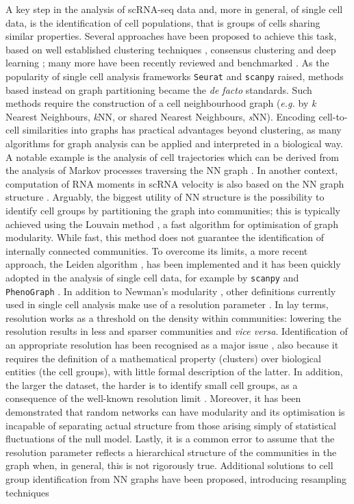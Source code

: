 \documentclass[10pt]{article}
\begin{document}
A key step in the analysis of scRNA-seq data and, more in general, of single cell data, is the identification of cell populations, that is groups of cells sharing similar properties. Several approaches have been proposed to achieve this task, based on well established clustering techniques \cite{wang_2017, lin_2017}, consensus clustering \cite{huh_2020, kiselev_2017, Ranjan_2021} and deep learning \cite{li_2020}; many more have been recently reviewed \cite{krzak_2019, kiselev_2019} and benchmarked \cite{du_2018}. As the popularity of single cell analysis frameworks \texttt{Seurat} \cite{butler_2018} and \texttt{scanpy} \cite{wolf_2018} raised, methods based instead on graph partitioning became the \emph{de facto} standards. Such methods require the construction of a cell neighbourhood graph (\emph{e.g.} by \emph{k }Nearest Neighbours, \emph{k}NN, or shared Nearest Neighbours, \emph{s}NN). Encoding cell-to-cell similarities into graphs has practical advantages beyond clustering, as many algorithms for graph analysis can be applied and interpreted in a biological way. A notable example is the analysis of cell trajectories which can be derived from the analysis of Markov processes traversing the NN graph \cite{Setty_2019, Lange_2020}. In another context, computation of RNA moments in scRNA velocity is also based on the NN graph structure \cite{Bergen_2020}. Arguably, the biggest utility of NN structure is the possibility to identify cell groups by partitioning the graph into communities; this is typically achieved using the Louvain method \cite{blondel_2008}, a fast algorithm for optimisation of graph modularity. While fast, this method does not guarantee the identification of internally connected communities. To overcome its limits, a more recent approach, the Leiden algorithm \cite{traag_2019}, has been implemented and it has been quickly adopted in the analysis of single cell data, for example by \texttt{scanpy} \cite{wolf_2018} and \texttt{PhenoGraph} \cite{levine_2015}. In addition to Newman's modularity \cite{newman_2004}, other definitions currently used in single cell analysis make use of a resolution parameter \cite{traag_2011, reichardt_2006}. In lay terms, resolution works as a threshold on the density within communities: lowering the resolution results in less and sparser communities and \emph{vice versa}. Identification of an appropriate resolution has been recognised as a major issue \cite{lhnemann_2020}, also because it requires the definition of a mathematical property (clusters) over biological entities (the cell groups), with little formal description of the latter. In addition, the larger the dataset, the harder is to identify small cell groups, as a consequence of the well-known resolution limit \cite{fortunato_2007}. Moreover, it has been demonstrated that random networks can have modularity \cite{guimer_2004} and its optimisation is incapable of separating actual structure from those arising simply of statistical fluctuations of the null model. Lastly, it is a common error to assume that the resolution parameter reflects a hierarchical structure of the communities in the graph when, in general, this is not rigorously true. Additional solutions to cell group identification from NN graphs have been proposed, introducing resampling techniques 
\end{document}
